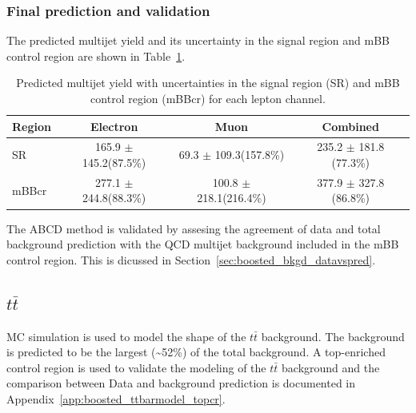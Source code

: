 %
%
\subsubsection{Final prediction and validation}
\label{sec:boosted_bkgd_qcdmultijet_predict_valid}
 
The predicted multijet yield and its uncertainty in the signal region and mBB control region are
shown in Table~\ref{tab:boosted_syst_qcd_norm_unc}.
 
\begin{table}[!htbp]
\begin{center}
\begin{tabular}{l|c|c|c}
Region    & Electron                   & Muon                       & Combined                   \\  
\hline
SR        & 165.9 $\pm$ 145.2(87.5\%) & 69.3 $\pm$ 109.3(157.8\%)   & 235.2 $\pm$ 181.8 (77.3\%) \\
mBBcr     & 277.1 $\pm$ 244.8(88.3\%) & 100.8 $\pm$ 218.1(216.4\%)  & 377.9 $\pm$ 327.8 (86.8\%) \\
\hline
\end{tabular}
\end{center}
\caption{Predicted multijet yield with uncertainties in the signal region (SR) and mBB control region (mBBcr)
for each lepton channel.}
\label{tab:boosted_syst_qcd_norm_unc}
\end{table}
 
The ABCD method is validated by assesing the agreement of data and total background prediction with the QCD multijet background included
in the mBB control region. This is dicussed in Section~\ref{sec:boosted_bkgd_datavspred}.
 
%
%
\subsection{$t\bar{t}$}
\label{sec:boosted_bkgd_ttbar}
 
MC simulation is used to model the shape of the $t\bar{t}$ background. The background
is predicted to be the largest (\textasciitilde 52\%) of the total background. A top-enriched control region
is used to validate the modeling of the $t\bar{t}$ background and the comparison between Data and
background prediction is documented in Appendix~\ref{app:boosted_ttbarmodel_topcr}.
 

